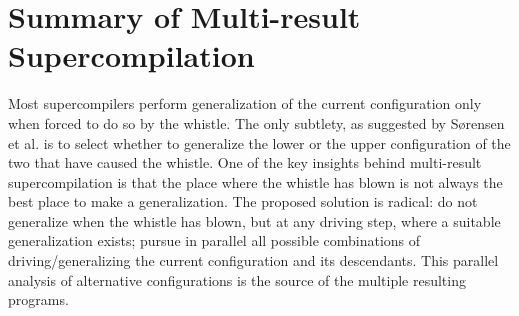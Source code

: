 \documentclass[submission,copyright,creativecommons]{eptcs}
\begin{document}
\section{Summary of Multi-result Supercompilation}\label{sec:MRSCSummary}

Most supercompilers perform generalization of the current configuration only
when forced to do so by the whistle.
The only subtlety, as suggested by S{\o}rensen et al. \cite{sorm98b} is to select
whether to generalize the lower or the upper configuration of the two that
have caused the whistle.
One of the key insights behind multi-result supercompilation is that the place
where the whistle has blown is not always the best place to make a generalization.
The proposed solution is radical: do not generalize when the whistle has blown,
but at any driving step, where a suitable generalization exists;
pursue in parallel all possible combinations of driving/generalizing 
the current configuration and its descendants.
This parallel analysis of alternative configurations is the source
of the multiple resulting programs.
\end{document}
